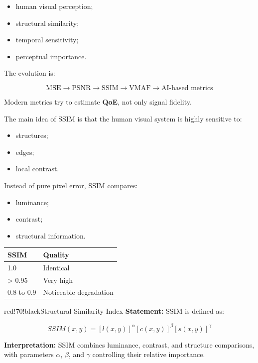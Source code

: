 \begin{itemize}
\item human visual perception;
\item structural similarity;
\item temporal sensitivity;
\item perceptual importance.
\end{itemize}

The evolution is:

\[
\text{MSE} \rightarrow \text{PSNR} \rightarrow \text{SSIM} \rightarrow \text{VMAF}
\rightarrow \text{AI-based metrics}
\]

Modern metrics try to estimate \textbf{QoE}, not only signal fidelity.

The main idea of SSIM is that the human visual system is highly sensitive to:

\begin{itemize}
\item structures;
\item edges;
\item local contrast.
\end{itemize}

Instead of pure pixel error, SSIM compares:

\begin{itemize}
\item luminance;
\item contrast;
\item structural information.
\end{itemize}

\begin{center}
\begin{tabular}{|l|l|}
\hline
\textbf{SSIM} & \textbf{Quality} \\ \hline
1.0 & Identical \\ \hline
\textgreater{} 0.95 & Very high \\ \hline
0.8 to 0.9 & Noticeable degradation \\ \hline
\end{tabular}
\end{center}

\begin{calloutbox}{red!70!black}{Structural Similarity Index}
\textbf{Statement:} SSIM is defined as:

\[
SSIM(x,y) = [l(x,y)]^\alpha [c(x,y)]^\beta [s(x,y)]^\gamma
\]

\textbf{Interpretation:} SSIM combines luminance, contrast, and structure comparisons, with parameters $\alpha$, $\beta$, and $\gamma$ controlling their relative importance.
\end{calloutbox}

